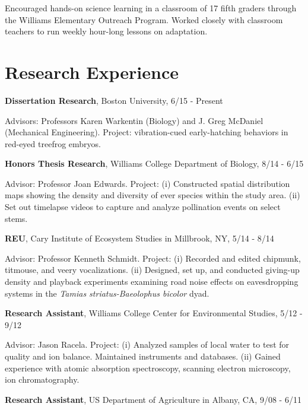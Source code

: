 \documentclass[margin,line]{res}
\begin{document}
\begin{resume}
\vspace{-.43cm}
{Encouraged hands-on science learning in a classroom of 17 fifth graders through the Williams Elementary Outreach Program. Worked closely with classroom teachers to run weekly hour-long lessons on adaptation. }

\section{\sc Research Experience}
{\bf Dissertation Research},  Boston University, 6/15 - Present

\vspace{-.43cm}
{Advisors: Professors Karen Warkentin (Biology) and J. Greg McDaniel (Mechanical Engineering). Project: vibration-cued early-hatching behaviors in red-eyed treefrog embryos. }

\vspace{-.1cm}
{\bf Honors Thesis Research},  Williams College Department of Biology, 8/14 - 6/15 

\vspace{-.43cm}
{Advisor: Professor Joan Edwards. Project: (i) Constructed spatial distribution maps showing the density and diversity of ever species within the study area. (ii) Set out timelapse videos to capture and analyze pollination events on select stems.} 

\vspace{-.1cm}
{\bf REU},  Cary Institute of Ecosystem Studies in Millbrook, NY, 5/14 - 8/14

\vspace{-.43cm}
{Advisor: Professor Kenneth Schmidt. Project: (i) Recorded and edited chipmunk, titmouse, and veery vocalizations. (ii) Designed, set up, and conducted giving-up density and playback experiments examining road noise effects on eavesdropping systems in the {\it Tamias striatus-Baeolophus bicolor} dyad.}

\vspace{-.1cm}
{\bf Research Assistant},  Williams College Center for Environmental Studies, 5/12 - 9/12

\vspace{-.43cm}
{Advisor: Jason Racela. Project: (i) Analyzed samples of local water to test for quality and ion balance. Maintained instruments and databases. (ii) Gained experience with atomic absorption spectroscopy, scanning electron microscopy, ion chromatography.}

\vspace{-.1cm}
{\bf Research Assistant},  US Department of Agriculture in Albany, CA, 9/08 - 6/11


\end{resume}
\end{document}
